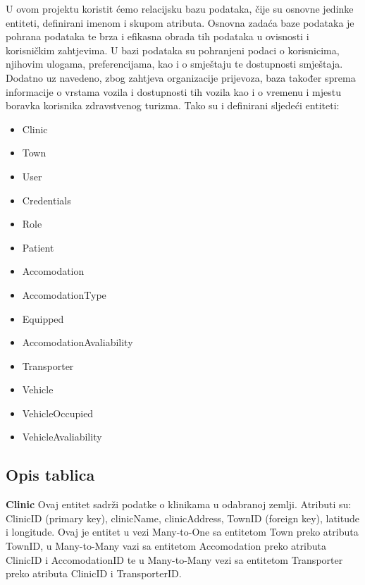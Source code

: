 			
			U ovom projektu koristit ćemo relacijsku bazu podataka, čije su osnovne jedinke entiteti, definirani imenom i skupom atributa. Osnovna zadaća baze podataka je pohrana podataka te brza i efikasna obrada tih podataka u ovisnosti i korisničkim zahtjevima. U bazi podataka su pohranjeni podaci o korisnicima, njihovim ulogama, preferencijama, kao i o smještaju te dostupnosti smještaja. Dodatno uz navedeno, zbog zahtjeva organizacije prijevoza, baza također sprema informacije o vrstama vozila i dostupnosti tih vozila kao i o vremenu i mjestu boravka korisnika zdravstvenog turizma. Tako su i definirani sljedeći entiteti:
			\begin{itemize}
				\item Clinic
				\item Town
				\item User
				\item Credentials
				\item Role
				\item Patient
				\item Accomodation
				\item AccomodationType
				\item Equipped
				\item AccomodationAvaliability
				\item Transporter
				\item Vehicle
				\item VehicleOccupied
				\item VehicleAvaliability
			\end{itemize}
		
			\subsection{Opis tablica}
			
				\textbf{Clinic} Ovaj entitet sadrži podatke o klinikama u odabranoj zemlji. Atributi su: ClinicID (primary key), clinicName, clinicAddress, TownID (foreign key), latitude i longitude. Ovaj je entitet u vezi Many-to-One sa entitetom Town preko atributa TownID, u Many-to-Many vazi sa entitetom Accomodation preko atributa ClinicID i AccomodationID te u Many-to-Many vezi sa entitetom Transporter preko atributa ClinicID i TransporterID.
				
